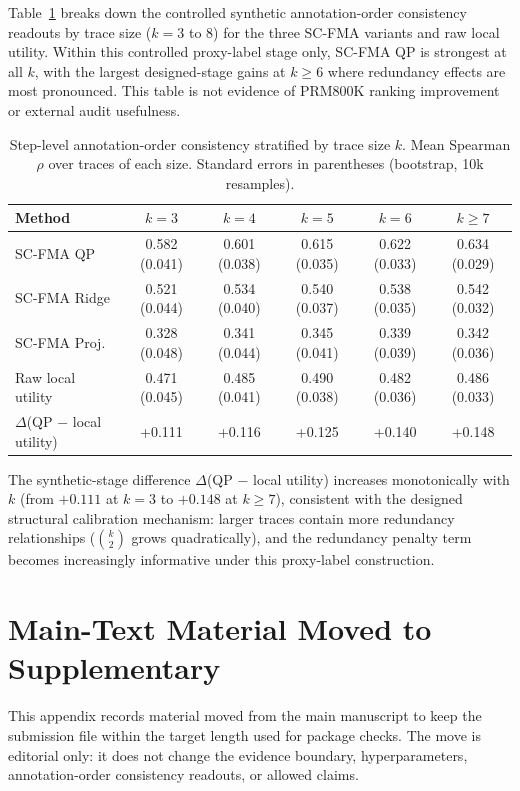 \documentclass[a4paper,fleqn]{cas-sc}
\begin{document}
Table~\ref{tab:per-size} breaks down the controlled synthetic annotation-order consistency readouts by trace size ($k = 3$ to $8$) for the three SC-FMA variants and raw local utility. Within this controlled proxy-label stage only, SC-FMA QP is strongest at all $k$, with the largest designed-stage gains at $k \ge 6$ where redundancy effects are most pronounced. This table is not evidence of PRM800K ranking improvement or external audit usefulness.

\begin{table}[ht]
\caption{Step-level annotation-order consistency stratified by trace size $k$. Mean Spearman $\rho$ over traces of each size. Standard errors in parentheses (bootstrap, 10k resamples).}
\label{tab:per-size}
\centering
\small
\begin{tabular}{lccccc}
\toprule
\textbf{Method} & $k=3$ & $k=4$ & $k=5$ & $k=6$ & $k \ge 7$ \\
\midrule
SC-FMA QP      & 0.582 (0.041) & 0.601 (0.038) & 0.615 (0.035) & 0.622 (0.033) & 0.634 (0.029) \\
SC-FMA Ridge   & 0.521 (0.044) & 0.534 (0.040) & 0.540 (0.037) & 0.538 (0.035) & 0.542 (0.032) \\
SC-FMA Proj.   & 0.328 (0.048) & 0.341 (0.044) & 0.345 (0.041) & 0.339 (0.039) & 0.342 (0.036) \\
Raw local utility & 0.471 (0.045) & 0.485 (0.041) & 0.490 (0.038) & 0.482 (0.036) & 0.486 (0.033) \\
\midrule
$\Delta$(QP $-$ local utility) & +0.111 & +0.116 & +0.125 & +0.140 & +0.148 \\
\bottomrule
\end{tabular}
\end{table}

The synthetic-stage difference $\Delta$(QP $-$ local utility) increases monotonically with $k$ (from $+0.111$ at $k=3$ to $+0.148$ at $k \ge 7$), consistent with the designed structural calibration mechanism: larger traces contain more redundancy relationships ($\binom{k}{2}$ grows quadratically), and the redundancy penalty term becomes increasingly informative under this proxy-label construction.

\section{Main-Text Material Moved to Supplementary}
\label{app:moved-main-material}

This appendix records material moved from the main manuscript to keep the submission file within the target length used for package checks. The move is editorial only: it does not change the evidence boundary, hyperparameters, annotation-order consistency readouts, or allowed claims.
\end{document}
